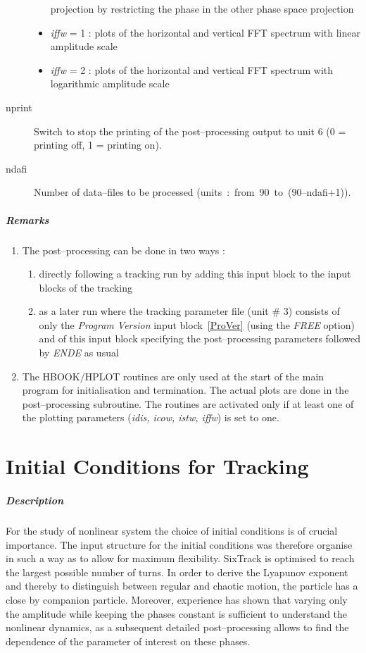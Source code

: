 \documentclass[a4paper,11pt]{report}
\begin{document}
\begin{description}
\begin{itemize}
    projection by restricting the phase in the other phase space
    projection
  \item {\em iffw} \/= 1 : plots of the horizontal and vertical FFT
    spectrum with linear amplitude scale
  \item {\em iffw} \/= 2 : plots of the horizontal and vertical FFT
    spectrum with logarithmic amplitude scale
  \end{itemize}
\item [nprint] Switch to stop the printing of the post--processing
  output to unit 6 (0 = printing off, 1 = printing on).
\item [ndafi] Number of data--files to be processed \mbox{(units :
    from 90 to (90--ndafi+1)\hspace{3mm}).}
\end{description}

\subparagraph{Remarks}
\begin{enumerate}
\item The post--processing can be done in two ways :
\begin{enumerate}
\item directly following a tracking run by adding this input block to
  the input blocks of the tracking
\item as a later run where the tracking parameter file (unit \# 3)
  consists of only the {\em Program Version} \/input
  block~\ref{ProVer} (using the {\em FREE} \/option) and of this input
  block specifying the post--processing parameters followed by {\em
    ENDE} \/as usual
\end{enumerate}
\item The HBOOK/HPLOT routines are only used at the start of the main
  program for initialisation and termination. The actual plots are
  done in the post--processing subroutine. The routines are activated
  only if at least one of the plotting parameters ({\em idis, icow,
    istw, iffw}\/) is set to one.
\end{enumerate}

\section{Initial Conditions for Tracking}

\subparagraph{Description} For the study of nonlinear system the
choice of initial conditions is of crucial importance. The input
structure for the initial conditions was therefore organise in such a
way as to allow for maximum flexibility. SixTrack is optimised to
reach the largest possible number of turns. In order to derive the
Lyapunov exponent and thereby to distinguish between regular and
chaotic motion, the particle has a close by companion particle.
Moreover, experience has shown that varying only the amplitude while
keeping the phases constant is sufficient to understand the nonlinear
dynamics, as a subsequent detailed post--processing allows to find the
dependence of the parameter of interest on these phases.
\end{document}
